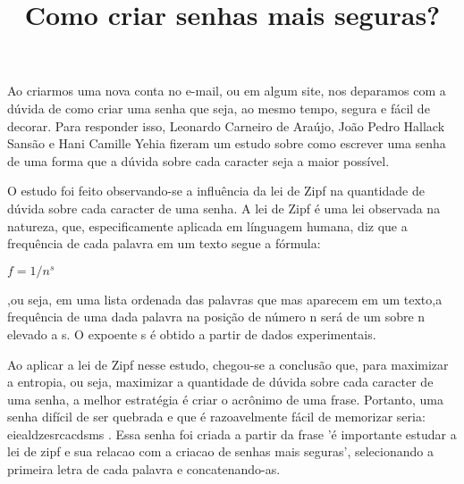 \documentclass{article}
\title{Como criar senhas mais seguras?}
\begin{document}
\maketitle
	Ao criarmos uma nova conta no e-mail, ou em algum site, nos deparamos com a dúvida de como criar uma senha que seja, ao mesmo tempo, segura e fácil de decorar. Para responder isso, Leonardo Carneiro de Araújo, João Pedro Hallack Sansão e Hani Camille Yehia fizeram um estudo sobre como escrever uma senha de uma forma que a dúvida sobre cada caracter seja a maior possível. 
	
	O estudo foi feito observando-se a influência da lei de Zipf na quantidade de dúvida sobre cada caracter de uma senha. A lei de Zipf é uma lei observada na natureza, que, especificamente aplicada em línguagem humana, diz que a frequência de cada palavra em um texto segue a fórmula:
	
	\setlength\parindent{128pt}				$f = 1/n^{s}$
	
	\noindent ,ou seja, em uma lista ordenada das palavras que mas aparecem em um texto,a frequência de uma dada palavra na posição de número n será de um sobre n elevado a s. O expoente s é obtido a partir de dados experimentais.
	
	Ao aplicar a lei de Zipf nesse estudo, chegou-se a conclusão que, para maximizar a entropia, ou seja, maximizar a quantidade de dúvida sobre cada caracter de uma senha, a melhor estratégia é criar o acrônimo de uma frase. Portanto, uma senha difícil de ser quebrada e que é razoavelmente fácil de memorizar seria: eiealdzesrcacdsms . Essa senha foi criada a partir da frase 'é importante estudar a lei de zipf e sua relacao com a criacao de senhas mais seguras', selecionando a primeira letra de cada palavra e concatenando-as.
\end{document}

